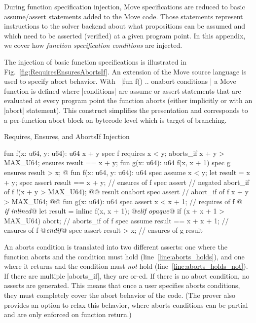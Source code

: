 
During function specification injection, Move specifications are reduced to basic
assume/assert statements added to the Move code.  Those statements represent
instructions to the solver backend about what propositions can be assumed and
which need to be asserted (verified) at a given program point.  In this appendix,
we cover how \emph{function specification conditions} are injected.


The injection of basic function specifications is illustrated in
Fig.~\ref{fig:RequiresEnsuresAbortsIf}.  An extension of the Move source
language is used to specify abort behavior. With~%
|fun f() { .. } onabort { conditions }| a Move function is defined where
|conditions| are assume or assert statements that are evaluated at every program
point the function aborts (either implicitly or with an |abort| statement). This
construct simplifies the presentation and corresponds to a per-function abort
block on bytecode level which is target of branching.

\begin{Figure}
  \caption{Requires, Ensures, and AbortsIf Injection}
  \label{fig:RequiresEnsuresAbortsIf}
  \centering
\begin{MoveBoxNumbered}
  fun f(x: u64, y: u64): u64 { x + y }
  spec f {
    requires x < y;
    aborts_if x + y > MAX_U64;
    ensures result == x + y;
  }
  fun g(x: u64): u64 { f(x, x + 1) }
  spec g {
    ensures result > x;
  }
  @\transform@
  fun f(x: u64, y: u64): u64 {
    spec assume x < y;
    let result = x + y;
    spec assert result == x + y;     // ensures of f
    spec assert                      // negated abort_if of f
      !(x + y > MAX_U64); @\label{line:aborts_holds_not}@
    result
  } onabort {
    spec assert                      // abort_if of f
      x + y > MAX_U64; @\label{line:aborts_holds}@
  }
  fun g(x: u64): u64 {
    spec assert x < x + 1;           // requires of f
@$\textrm{\it if inlined}$\label{line:inline}@
    let result = inline f(x, x + 1);
@$\textrm{\it elif opaque}$\label{line:opaque}@
    if (x + x + 1 > MAX_U64) abort;  // aborts_if of f
    spec assume result == x + x + 1; // ensures of f
@$\textrm{\it endif}$@
    spec assert result > x;          // ensures of g
    result
  }
\end{MoveBoxNumbered}
\end{Figure}

An aborts condition is translated into two different asserts: one where the
function aborts and the condition must hold (line~\ref{line:aborts_holds}), and
one where it returns and the condition must \emph{not} hold
(line~\ref{line:aborts_holds_not}). If there are multiple |aborts_if|, they are
or-ed. If there is no abort condition, no asserts are generated. This means
that once a user specifies aborts conditions, they must completely cover the
abort behavior of the code. (The prover also provides an option to relax this
behavior, where aborts conditions can be partial and are only enforced on
function return.)

